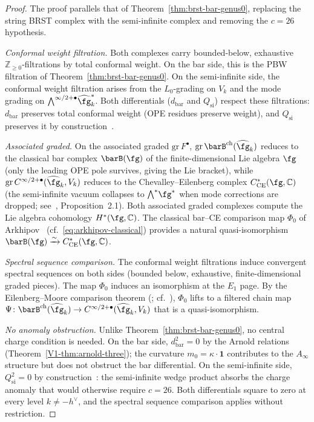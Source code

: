 \begin{proof}
The proof parallels that of
Theorem~\ref{thm:brst-bar-genus0}, replacing the string BRST
complex with the semi-infinite complex and removing the
$c = 26$ hypothesis.

\emph{Conformal weight filtration.}
Both complexes carry bounded-below, exhaustive
$\mathbb{Z}_{\geq 0}$-filtrations by total conformal weight.
On the bar side, this is the PBW filtration of
Theorem~\ref{thm:brst-bar-genus0}. On the semi-infinite
side, the conformal weight filtration arises from the
$L_0$-grading on $V_k$ and the mode grading on
$\bigwedge^{\infty/2+\bullet}\!\widehat{\fg}^*_k$. Both
differentials ($d_{\mathrm{bar}}$ and $Q_{\mathrm{si}}$) respect
these filtrations: $d_{\mathrm{bar}}$ preserves total conformal
weight (OPE residues preserve weight), and $Q_{\mathrm{si}}$
preserves it by construction~\cite{FGZ86}.

\emph{Associated graded.}
On the associated graded $\mathrm{gr}\,F^\bullet$,
$\mathrm{gr}\,\barB^{\mathrm{ch}}(\widehat{\fg}_k)$ reduces
to the classical bar complex $\barB(\fg)$ of the
finite-dimensional Lie algebra $\fg$
(only the leading OPE pole survives, giving the Lie bracket),
while $\mathrm{gr}\,C^{\infty/2+\bullet}(\widehat{\fg}_k, V_k)$
reduces to the Chevalley--Eilenberg complex
$C^*_{\mathrm{CE}}(\fg, \mathbb{C})$
(the semi-infinite vacuum collapses to $\bigwedge^*\!\fg^*$
when mode corrections are dropped;
see~\cite{FGZ86}, Proposition~2.1).
Both associated graded complexes compute the Lie algebra cohomology
$H^*(\fg, \mathbb{C})$. The classical bar--CE comparison map
$\Phi_0$ of Arkhipov~\cite{Arkhipov97}
(cf.\ \eqref{eq:arkhipov-classical}) provides a natural
quasi-isomorphism $\barB(\fg) \xrightarrow{\sim}
C^*_{\mathrm{CE}}(\fg, \mathbb{C})$.

\emph{Spectral sequence comparison.}
The conformal weight filtrations induce convergent spectral sequences
on both sides (bounded below, exhaustive, finite-dimensional
graded pieces). The map $\Phi_0$ induces an isomorphism at the
$E_1$ page. By the Eilenberg--Moore comparison theorem
(\cite{EM66}; cf.\ \cite[Theorem~5.2.12]{Weibel94}), $\Phi_0$ lifts
to a filtered chain map
$\Psi \colon \barB^{\mathrm{ch}}(\widehat{\fg}_k) \to
C^{\infty/2+\bullet}(\widehat{\fg}_k, V_k)$
that is a quasi-isomorphism.

\emph{No anomaly obstruction.}
Unlike Theorem~\ref{thm:brst-bar-genus0}, no central charge
condition is needed. On the bar side, $d_{\mathrm{bar}}^2 = 0$
by the Arnold relations
(Theorem~\ref{V1-thm:arnold-three}); the curvature
$m_0 = \kappa \cdot \mathbf{1}$ contributes to the $A_\infty$
structure but does not obstruct the bar differential. On the
semi-infinite side, $Q_{\mathrm{si}}^2 = 0$ by
construction~\cite{FGZ86}: the semi-infinite wedge product
absorbs the charge anomaly that would otherwise require
$c = 26$. Both differentials square to zero at every level
$k \neq -h^\vee$, and the spectral sequence comparison
applies without restriction.


\end{proof}
